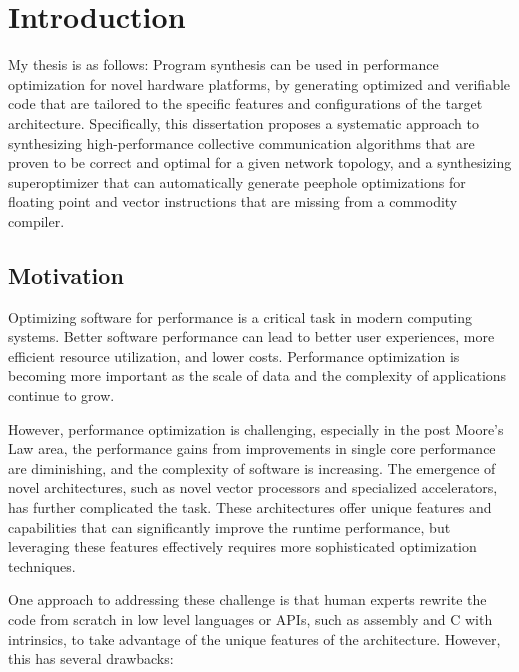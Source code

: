 \chapter{Introduction}
\label{chap:intro}

My thesis is as follows:
%
Program synthesis can be used in performance optimization for novel
hardware platforms, by generating optimized and verifiable code that
are tailored to the specific features and configurations of the target
architecture.
%
Specifically, this dissertation proposes a systematic approach to
synthesizing high-performance collective communication algorithms that
are proven to be correct and optimal for a given network topology, and
a synthesizing superoptimizer that can automatically generate peephole
optimizations for floating point and vector instructions that are
missing from a commodity compiler.

\section{Motivation}

Optimizing software for performance is a critical task in modern
computing systems.
%
Better software performance can lead to better user experiences, more
efficient resource utilization, and lower costs.
%
Performance optimization is becoming more important as the
scale of data and the complexity of applications continue to grow.


However, performance optimization is challenging, especially in the
post Moore's Law area, the performance gains from improvements in
single core performance are diminishing, and the complexity of
software is increasing.
%
The emergence of novel architectures, such as novel vector processors
and specialized accelerators, has further complicated the task.
%
These architectures offer unique features and capabilities that can
significantly improve the runtime performance, but leveraging these
features effectively requires more sophisticated optimization
techniques.

One approach to addressing these challenge is that human experts
rewrite the code from scratch in low level languages or APIs, such as assembly
and C with intrinsics, to take advantage of the unique features of the
architecture. However, this has several drawbacks:

